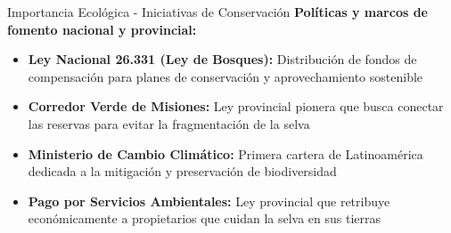 \documentclass[10pt]{beamer}
\begin{document}
\begin{frame}{Importancia Ecológica - Iniciativas de Conservación}
  \textbf{Políticas y marcos de fomento nacional y provincial:}
  
  \vspace{0.8em}
  \begin{itemize}
    \setlength{\itemsep}{0.5em}
    \item \textbf{Ley Nacional 26.331 (Ley de Bosques):} Distribución de fondos de compensación para planes de conservación y aprovechamiento sostenible
    \item \textbf{Corredor Verde de Misiones:} Ley provincial pionera que busca conectar las reservas para evitar la fragmentación de la selva
    \item \textbf{Ministerio de Cambio Climático:} Primera cartera de Latinoamérica dedicada a la mitigación y preservación de biodiversidad
    \item \textbf{Pago por Servicios Ambientales:} Ley provincial que retribuye económicamente a propietarios que cuidan la selva en sus tierras
  \end{itemize}
\end{frame}
\end{document}

